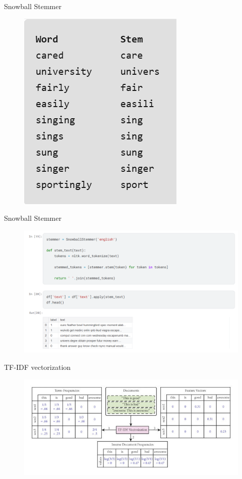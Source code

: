 \documentclass[serif, aspectratio=169]{beamer}
\begin{document}
	\begin{frame}{Snowball Stemmer}
		\begin{figure}
			\centering
			\includegraphics[width=0.4\linewidth]{pic/snowball-stemmer.png}
			\label{fig:snowball-stemmer}
		\end{figure}
	\end{frame}
	\begin{frame}{Snowball Stemmer}
		\begin{figure}
			\centering
			\includegraphics[width=0.8\linewidth]{pic/snowball-stemmer-apply.png}
			\label{fig:snowball-stemmer-apply}
		\end{figure}
	\end{frame}
	\begin{frame}{TF-IDF vectorization}
		\begin{figure}
			\centering
			\includegraphics[width=1\linewidth]{pic/Illustration-of-TFIDF-vectorization.png}
			\label{fig:Illustration-of-TFIDF-vectorization}
		\end{figure}
	\end{frame}
\end{document}
